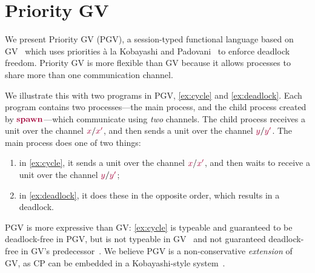 \section{Priority GV}\label{sec:pgv}

We present Priority GV (PGV), a session-typed functional language based on GV~\cite{wadler15,lindleymorris15} which uses priorities \`{a} la Kobayashi and Padovani~\cite{kobayashi06,padovaninovara15} to enforce deadlock freedom.
Priority GV is more flexible than GV because it allows processes to share more than one communication channel.

We illustrate this with two programs in PGV, \cref{ex:cycle} and \cref{ex:deadlock}. Each program contains two processes---the main process, and the child process created by $\tm{\spawn}$---which communicate using \emph{two} channels. The child process receives a unit over the channel $\tm{x}/\tm{x'}$, and then sends a unit over the channel $\tm{y}/\tm{y'}$. The main process does one of two things:
\begin{enumerate}[label= (\alph*) ]
  \item in \cref{ex:cycle}, it sends a unit over the channel $\tm{x}/\tm{x'}$, and then waits to receive a unit over the channel $\tm{y}/\tm{y'}$;
  \item in \cref{ex:deadlock}, it does these in the opposite order, which results in a deadlock.
\end{enumerate}
PGV is more expressive than GV: \cref{ex:cycle} is typeable and guaranteed to be deadlock-free in PGV, but is not typeable in GV~\cite{wadler14} and not guaranteed deadlock-free in GV's predecessor~\cite{gayvasconcelos10}. We believe PGV is a non-conservative \emph{extension} of GV, as CP can be embedded in a Kobayashi-style system~\cite{dardhaperez15extended}.

